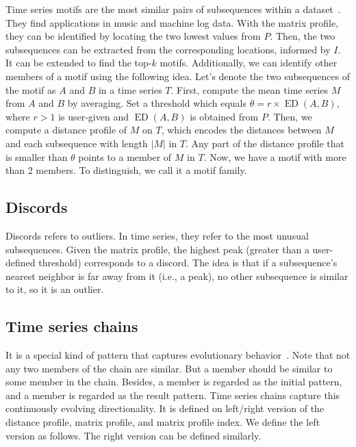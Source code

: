 Time series motifs are the most similar pairs of subsequences within a dataset~\cite{yeh2016matrix}. They find applications in music and machine log data.
With the matrix profile, they can be identified by locating the two lowest values from $P$. Then, the two subsequences can be extracted from the corresponding locations, informed by $I$.
It can be extended to find the top-$k$ motifs.
Additionally, we can identify other members of a motif using the following idea.
Let's denote the two subsequences of the motif as $A$ and $B$ in a time series $T$.
First, compute the mean time series $M$ from $A$ and $B$ by averaging.
Set a threshold which equals $\theta = r \times \operatorname{ED}(A, B)$, where $r > 1$ is user-given and $\operatorname{ED}(A, B)$ is obtained from $P$.
Then, we compute a distance profile of $M$ on $T$, which encodes the distances between $M$ and each subsequence with length $|M|$ in $T$.
Any part of the distance profile that is smaller than $\theta$ points to a member of $M$ in $T$.
Now, we have a motif with more than 2 members. To distinguish, we call it a motif family.

\subsection{Discords} %

Discords refers to outliers. In time series, they refer to the most unusual subsequences.
Given the matrix profile, the highest peak (greater than a user-defined threshold) corresponds to a discord.
The idea is that if a subsequence's nearest neighbor is far away from it (i.e., a peak), no other subsequence is similar to it, so it is an outlier.

\subsection{Time series chains} %

It is a special kind of pattern that captures evolutionary behavior~\cite{zhu2017matrix}.
Note that not any two members of the chain are similar.
But a member should be similar to some member in the chain.
Besides, a member is regarded as the initial pattern, and a member is regarded as the result pattern.
Time series chains capture this continuously evolving directionality.
It is defined on left/right version of the distance profile, matrix profile, and matrix profile index.
We define the left version as follows. The right version can be defined similarly.

